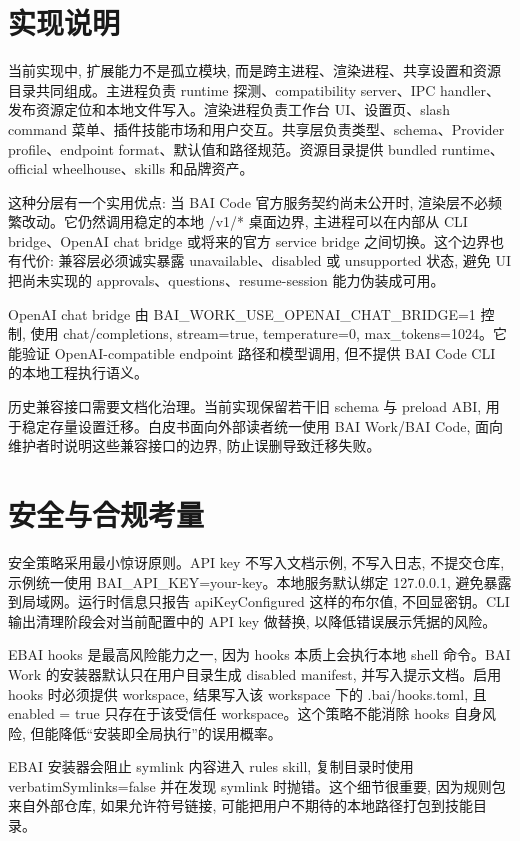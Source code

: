 \section{实现说明}
当前实现中, 扩展能力不是孤立模块, 而是跨主进程、渲染进程、共享设置和资源目录共同组成。主进程负责 runtime 探测、compatibility server、IPC handler、发布资源定位和本地文件写入。渲染进程负责工作台 UI、设置页、slash command 菜单、插件技能市场和用户交互。共享层负责类型、schema、Provider profile、endpoint format、默认值和路径规范。资源目录提供 bundled runtime、official wheelhouse、skills 和品牌资产。

这种分层有一个实用优点: 当 BAI Code 官方服务契约尚未公开时, 渲染层不必频繁改动。它仍然调用稳定的本地 /v1/* 桌面边界, 主进程可以在内部从 CLI bridge、OpenAI chat bridge 或将来的官方 service bridge 之间切换。这个边界也有代价: 兼容层必须诚实暴露 unavailable、disabled 或 unsupported 状态, 避免 UI 把尚未实现的 approvals、questions、resume-session 能力伪装成可用。

OpenAI chat bridge 由 BAI\_WORK\_USE\_OPENAI\_CHAT\_BRIDGE=1 控制, 使用 chat/completions, stream=true, temperature=0, max\_tokens=1024。它能验证 OpenAI-compatible endpoint 路径和模型调用, 但不提供 BAI Code CLI 的本地工程执行语义。

历史兼容接口需要文档化治理。当前实现保留若干旧 schema 与 preload ABI, 用于稳定存量设置迁移。白皮书面向外部读者统一使用 BAI Work/BAI Code, 面向维护者时说明这些兼容接口的边界, 防止误删导致迁移失败。

\section{安全与合规考量}
安全策略采用最小惊讶原则。API key 不写入文档示例, 不写入日志, 不提交仓库, 示例统一使用 BAI\_API\_KEY=your-key。本地服务默认绑定 127.0.0.1, 避免暴露到局域网。运行时信息只报告 apiKeyConfigured 这样的布尔值, 不回显密钥。CLI 输出清理阶段会对当前配置中的 API key 做替换, 以降低错误展示凭据的风险。

EBAI hooks 是最高风险能力之一, 因为 hooks 本质上会执行本地 shell 命令。BAI Work 的安装器默认只在用户目录生成 disabled manifest, 并写入提示文档。启用 hooks 时必须提供 workspace, 结果写入该 workspace 下的 .bai/hooks.toml, 且 enabled = true 只存在于该受信任 workspace。这个策略不能消除 hooks 自身风险, 但能降低“安装即全局执行”的误用概率。

EBAI 安装器会阻止 symlink 内容进入 rules skill, 复制目录时使用 verbatimSymlinks=false 并在发现 symlink 时抛错。这个细节很重要, 因为规则包来自外部仓库, 如果允许符号链接, 可能把用户不期待的本地路径打包到技能目录。

